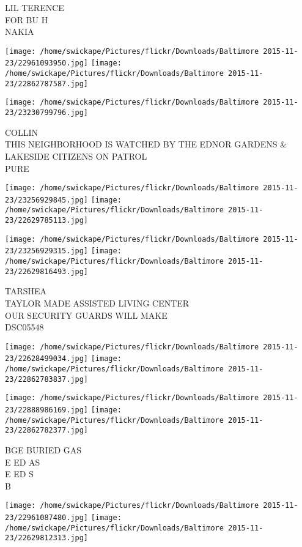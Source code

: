 \documentclass[10pt,letterpaper]{article}
\begin{document}
LIL TERENCE\\
FOR BU H\\
NAKIA
\pagebreak

\texttt{[image: /home/swickape/Pictures/flickr/Downloads/Baltimore 2015-11-23/22961093950.jpg]}
\texttt{[image: /home/swickape/Pictures/flickr/Downloads/Baltimore 2015-11-23/22862787587.jpg]}

\vspace{0.25in}
\texttt{[image: /home/swickape/Pictures/flickr/Downloads/Baltimore 2015-11-23/23230799796.jpg]}

COLLIN\\
THIS NEIGHBORHOOD IS WATCHED BY THE EDNOR GARDENS \& LAKESIDE CITIZENS ON PATROL\\
PURE
\pagebreak

\texttt{[image: /home/swickape/Pictures/flickr/Downloads/Baltimore 2015-11-23/23256929845.jpg]}
\texttt{[image: /home/swickape/Pictures/flickr/Downloads/Baltimore 2015-11-23/22629785113.jpg]}

\texttt{[image: /home/swickape/Pictures/flickr/Downloads/Baltimore 2015-11-23/23256929315.jpg]}
\texttt{[image: /home/swickape/Pictures/flickr/Downloads/Baltimore 2015-11-23/22629816493.jpg]}

TARSHEA\\
TAYLOR MADE ASSISTED LIVING CENTER\\
OUR SECURITY GUARDS WILL MAKE\\
DSC05548
\pagebreak

\texttt{[image: /home/swickape/Pictures/flickr/Downloads/Baltimore 2015-11-23/22628499034.jpg]}
\texttt{[image: /home/swickape/Pictures/flickr/Downloads/Baltimore 2015-11-23/22862783837.jpg]}

\texttt{[image: /home/swickape/Pictures/flickr/Downloads/Baltimore 2015-11-23/22888986169.jpg]}
\texttt{[image: /home/swickape/Pictures/flickr/Downloads/Baltimore 2015-11-23/22862782377.jpg]}

BGE BURIED GAS\\
E ED AS\\
E ED S\\
B
\pagebreak

\texttt{[image: /home/swickape/Pictures/flickr/Downloads/Baltimore 2015-11-23/22961087480.jpg]}
\texttt{[image: /home/swickape/Pictures/flickr/Downloads/Baltimore 2015-11-23/22629812313.jpg]}
\end{document}
